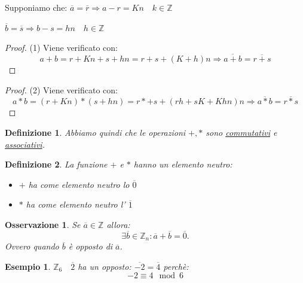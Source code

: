 \documentclass{article}
\newtheorem{exmp}{Esempio}[section]
\newtheorem{definition}{Definizione}[section]
\newtheorem{oss}{Osservazione}[section]
\begin{document}
Supponiamo che:
$\overline{a} = \overline{r} \Rightarrow a - r = Kn \quad k \in \mathbb{Z}$ \par 
$\overline{b} = \overline{s} \Rightarrow b - s = hn \quad h \in \mathbb{Z}$ \par 

\begin{proof}
        (1) Viene verificato con:
       \begin{equation*}
               a + b = r + Kn + s + hn = r+s + (K+h)n \Rightarrow \overline{a+b} = \overline{r + s}
       \end{equation*}
\end{proof}

\begin{proof}
       (2) Viene verificato con:
       \begin{equation*}
               a * b = (r + Kn) * (s + hn) = r*+s + (rh +sK + Khn)n \Rightarrow \overline{a*b} = \overline{r * s}
       \end{equation*}
\end{proof}


\begin{definition}
        Abbiamo quindi che le operazioni $+ , *$ sono \underline{commutativi} e \underline{associativi}. 
\end{definition}


\begin{definition}
        La funzione $+$ e $ * $ hanno un elemento neutro:
        \begin{itemize}
                \item $+$ ha come elemento neutro lo $\overline{0}$ 
                \item $*$ ha come elemento neutro l' $\overline{1}$ 
        \end{itemize}
\end{definition}

\begin{oss}
        Se $\overline{a} \in \mathbb{Z}$ allora:
        \begin{equation*}
                \exists \overline{b} \in \mathbb{Z}_n : \overline{a} + \overline{b} = \overline{0}.
        \end{equation*}
        Ovvero quando $ \overline{b}$ è opposto di $\overline{a}$.
\end{oss}

\begin{exmp}
        $ \mathbb{Z}_6 \quad \overline{2}$ ha un opposto: $\overline{-2} = \overline{4}$ perchè:
        \begin{equation*}
                -2 \equiv 4 \mod 6
        \end{equation*}
\end{exmp}
\end{document}
